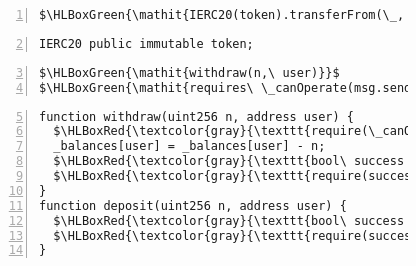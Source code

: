\begin{figure}[t]
\centering
\begin{lstlisting}[language=Consol,numbers=left,stepnumber=1,xleftmargin=0.8em,numberstyle=\ttfamily\color{gray},numbersep=3pt,firstnumber=1]
$\HLBoxGreen{\mathit{IERC20(token).transferFrom(\_, \_, \_)\ returns\ (ret)\ requires\ ret}}$
\end{lstlisting}
\vspace{-0.45em}
\begin{lstlisting}[numbers=left,stepnumber=1,xleftmargin=1em,numberstyle=\ttfamily\color{gray},numbersep=3pt,firstnumber=2]
IERC20 public immutable token;
\end{lstlisting}
\vspace{-0.4em}
\begin{lstlisting}[language=Consol,numbers=left,stepnumber=1,xleftmargin=0.8em,numberstyle=\ttfamily\color{gray},numbersep=3pt,firstnumber=3]
$\HLBoxGreen{\mathit{withdraw(n,\ user)}}$
$\HLBoxGreen{\mathit{requires\ \_canOperate(msg.sender,\ user)}} \HLBoxRedUnderlined{\mathit{\&\&\ \_balances[user]\ >=\ n}}$
\end{lstlisting}
\vspace{-0.45em}
\begin{lstlisting}[numbers=left,stepnumber=1,xleftmargin=1em,numberstyle=\ttfamily\color{gray},numbersep=3pt,firstnumber=5]
function withdraw(uint256 n, address user) {
  $\HLBoxRed{\textcolor{gray}{\texttt{require(\_canOperate(msg.sender, user));}}}$
  _balances[user] = _balances[user] - n;
  $\HLBoxRed{\textcolor{gray}{\texttt{bool\ success =}}}$ token.transferFrom(address(this), user, n);
  $\HLBoxRed{\textcolor{gray}{\texttt{require(success)}}}$  
}
function deposit(uint256 n, address user) {
  $\HLBoxRed{\textcolor{gray}{\texttt{bool\ success =}}}$ token.transferFrom(user, address(this), n);
  $\HLBoxRed{\textcolor{gray}{\texttt{require(success);}}}$  
}
\end{lstlisting}


\end{figure}
